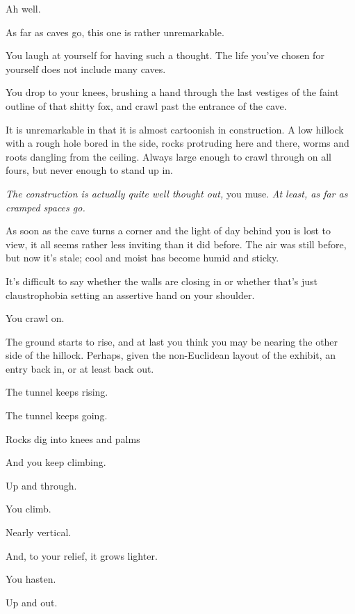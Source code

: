 Ah well.

\newpage

As far as caves go, this one is rather unremarkable.

You laugh at yourself for having such a thought. The life you've chosen for yourself does not include many caves.

You drop to your knees, brushing a hand through the last vestiges of the faint outline of that shitty fox, and crawl past the entrance of the cave.

It is unremarkable in that it is almost cartoonish in construction. A low hillock with a rough hole bored in the side, rocks protruding here and there, worms and roots dangling from the ceiling. Always large enough to crawl through on all fours, but never enough to stand up in.

\emph{The construction is actually quite well thought out,} you muse. \emph{At least, as far as cramped spaces go.}

As soon as the cave turns a corner and the light of day behind you is lost to view, it all seems rather less inviting than it did before. The air was still before, but now it's stale; cool and moist has become humid and sticky.

It's difficult to say whether the walls are closing in or whether that's just claustrophobia setting an assertive hand on your shoulder.

You crawl on.

The ground starts to rise, and at last you think you may be nearing the other side of the hillock. Perhaps, given the non-Euclidean layout of the exhibit, an entry back in, or at least back out.

\newpage

\null
\vfill

The tunnel keeps rising.

\newpage

\null
\vfill

The tunnel keeps going.

\vfill

\newpage

\null
\vspace{2in}

Rocks dig into knees and palms

\newpage

\null
\vspace{1in}

And you keep climbing.

\newpage

Up and through.

\newpage

You climb.

\vfill

Nearly vertical.

\vfill

And, to your relief, it grows lighter.

\vfill

You hasten.

\vfill

Up and out.
